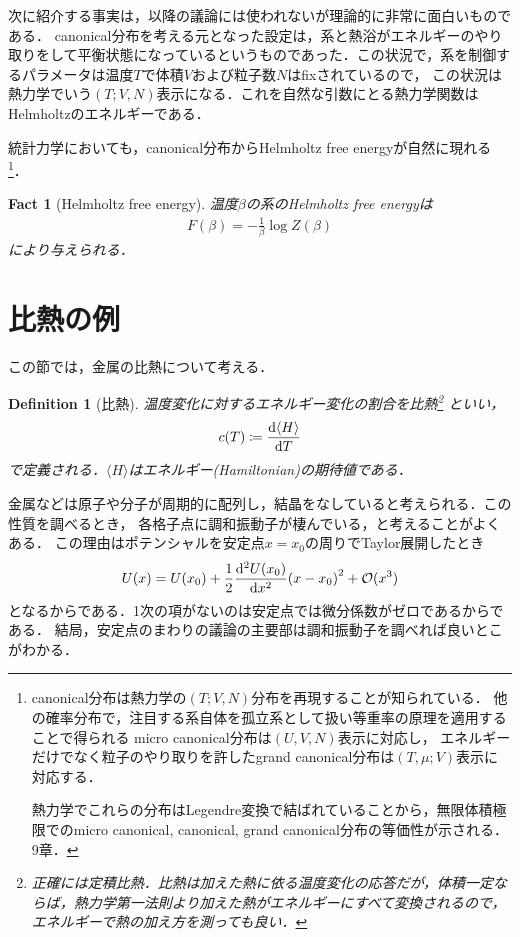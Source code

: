 \documentclass[dvipdfmx, a4paper]{jsarticle}
\theoremstyle{break}
\newtheorem{defn}[thm]{Definition}
\newtheorem{fact}[thm]{Fact}
\renewcommand{\O}{\mathcal{O}}
\numberwithin{equation}{section}
\begin{document}
	次に紹介する事実は，以降の議論には使われないが理論的に非常に面白いものである．
	canonical分布を考える元となった設定は，系と熱浴がエネルギーのやり取りをして平衡状態になっているというものであった．この状況で，系を制御するパラメータは温度$T$で体積$V$および粒子数$N$はfixされているので，
	この状況は熱力学でいう$(T; V, N)$表示になる．これを自然な引数にとる熱力学関数はHelmholtzのエネルギーである．

	統計力学においても，canonical分布からHelmholtz free energyが自然に現れる
	\footnote{
			canonical分布は熱力学の$(T; V, N)$分布を再現することが知られている．
			他の確率分布で，注目する系自体を孤立系として扱い等重率の原理を適用することで得られる
			micro canonical分布は$(U, V, N)$表示に対応し，
			エネルギーだけでなく粒子のやり取りを許したgrand canonical分布は$(T, \mu; V)$表示に対応する．

			熱力学でこれらの分布はLegendre変換で結ばれていることから，無限体積極限でのmicro canonical, canonical, grand canonical分布の等価性が示される．\cite{Tasaki_statmech}9章．
	}．
	\begin{fact}[Helmholtz free energy]
			温度$\beta$の系のHelmholtz free energyは
			\begin{align}
					F(\beta) = -\frac{1}{\beta}\log Z(\beta) \label{eq:Helmholtz}
			\end{align}
			により与えられる．
	\end{fact}




	\section{比熱の例}\label{sec:heat_capacity}
	この節では，金属の比熱について考える．
	\begin{defn}[比熱]
			温度変化に対するエネルギー変化の割合を比熱\footnote{正確には定積比熱．比熱は加えた熱に依る温度変化の応答だが，体積一定ならば，熱力学第一法則より加えた熱がエネルギーにすべて変換されるので，エネルギーで熱の加え方を測っても良い．}
			といい，
			\begin{align}
					c(T) \coloneqq \dv{\langle H \rangle}{T}
			\end{align}
			で定義される．$\langle H \rangle$はエネルギー(Hamiltonian)の期待値である．
	\end{defn}

	金属などは原子や分子が周期的に配列し，結晶をなしていると考えられる．この性質を調べるとき，
	各格子点に調和振動子が棲んでいる，と考えることがよくある．
	この理由はポテンシャルを安定点$x = x_0$の周りでTaylor展開したとき
	\begin{align}
			U(x) = U(x_0)  + \frac{1}{2}\dv[2]{U(x_0)}{x} \qty(x-x_0)^2  + \O (x^3)
	\end{align}
	となるからである．1次の項がないのは安定点では微分係数がゼロであるからである．
	結局，安定点のまわりの議論の主要部は調和振動子を調べれば良いとこがわかる．
\end{document}
